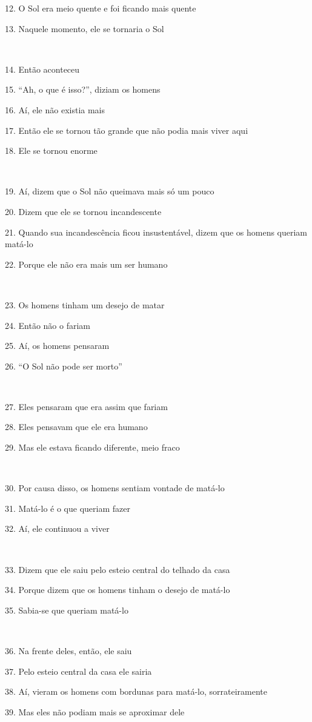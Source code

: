 12. O Sol era meio quente e foi ficando mais quente

13. Naquele momento, ele se tornaria o Sol

~

14. Então aconteceu

15. ``Ah, o que é isso?'', diziam os homens

16. Aí, ele não existia mais

17. Então ele se tornou tão grande que não podia mais viver aqui

18. Ele se tornou enorme

~

19. Aí, dizem que o Sol não queimava mais só um pouco

20. Dizem que ele se tornou incandescente

21. Quando sua incandescência ficou insustentável, dizem que os homens
queriam matá-lo

22. Porque ele não era mais um ser humano

~

23. Os homens tinham um desejo de matar

24. Então não o fariam

25. Aí, os homens pensaram

26. ``O Sol não pode ser morto''

~

27. Eles pensaram que era assim que fariam

28. Eles pensavam que ele era humano

29. Mas ele estava ficando diferente, meio fraco

~

30. Por causa disso, os homens sentiam vontade de matá-lo

31. Matá-lo é o que queriam fazer

32. Aí, ele continuou a viver

~

33. Dizem que ele saiu pelo esteio central do telhado da casa

34. Porque dizem que os homens tinham o desejo de matá-lo

35. Sabia-se que queriam matá-lo

~

36. Na frente deles, então, ele saiu

37. Pelo esteio central da casa ele sairia

38. Aí, vieram os homens com bordunas para matá-lo, sorrateiramente

39. Mas eles não podiam mais se aproximar dele

